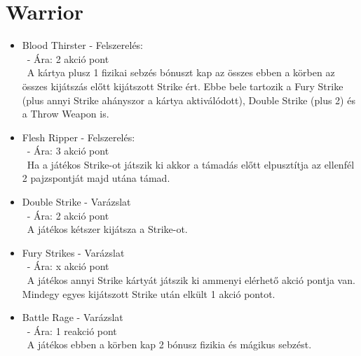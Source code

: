 \section{Warrior}
\begin{itemize}
    \item Blood Thirster - Felszerelés:\\\
    - Ára: 2 akció pont \\\
    A kártya plusz 1 fizikai sebzés bónuszt kap az összes ebben a körben az összes kijátszás előtt kijátszott Strike ért. Ebbe bele tartozik a Fury Strike (plus annyi Strike ahányszor a kártya aktiválódott), Double Strike (plus 2) és a Throw Weapon is. 
    \item Flesh Ripper - Felszerelés:\\\
    - Ára: 3 akció pont \\\
    Ha a játékos Strike-ot játszik ki akkor a támadás előtt elpusztítja az ellenfél 2 pajzspontját majd utána támad.
    \item Double Strike - Varázslat\\\
    - Ára: 2 akció pont \\\
    A játékos kétszer kijátsza a Strike-ot.
    \item Fury Strikes - Varázslat\\\
    - Ára: x akció pont \\\
    A játékos annyi Strike kártyát játszik ki ammenyi elérhető akció pontja van. Mindegy egyes kijátszott Strike után elkült 1 akció pontot.
    \item Battle Rage - Varázslat\\\
    - Ára: 1 reakció pont \\\
    A játékos ebben a körben kap 2 bónusz fizikia és mágikus sebzést.
\end{itemize}

\clearpage

